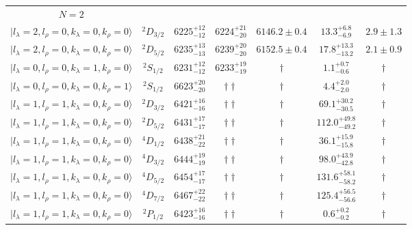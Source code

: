 \begin{tabular}{c c| c c c c c }
\hline
 $N=2$  &  &  &  &  &  \\ 
$\vert l_{\lambda}\!\!=\!2, l_{\rho}\!\!=\!0, k_{\lambda}\!\!=\!0, k_{\rho}\!\!=\!0 \rangle$ & $^{2}D_{3/2}$ & $6225^{+12}_{-12}$ & $6224^{+21}_{-20}$ & $6146.2\pm 0.4$ & $13.3^{+6.8}_{-6.9}$ & $2.9\pm 1.3$ \\ 
$\vert l_{\lambda}\!\!=\!2, l_{\rho}\!\!=\!0, k_{\lambda}\!\!=\!0, k_{\rho}\!\!=\!0 \rangle$ & $^{2}D_{5/2}$ & $6235^{+13}_{-13}$ & $6239^{+20}_{-20}$ & $6152.5\pm 0.4$ & $17.8^{+13.3}_{-13.2}$ & $2.1\pm 0.9$ \\ 
$\vert l_{\lambda}\!\!=\!0, l_{\rho}\!\!=\!0, k_{\lambda}\!\!=\!1, k_{\rho}\!\!=\!0 \rangle$ & $^{2}S_{1/2}$ & $6231^{+12}_{-12}$ & $6233^{+19}_{-19}$ & $\dagger$ & $1.1^{+0.7}_{-0.6}$ & $\dagger$ \\ 
$\vert l_{\lambda}\!\!=\!0, l_{\rho}\!\!=\!0, k_{\lambda}\!\!=\!0, k_{\rho}\!\!=\!1 \rangle$ & $^{2}S_{1/2}$ & $6623^{+20}_{-20}$ & $\dagger\dagger$ & $\dagger$ & $4.4^{+2.0}_{-2.0}$ & $\dagger$ \\ 
$\vert l_{\lambda}\!\!=\!1, l_{\rho}\!\!=\!1, k_{\lambda}\!\!=\!0, k_{\rho}\!\!=\!0 \rangle$ & $^{2}D_{3/2}$ & $6421^{+16}_{-16}$ & $\dagger\dagger$ & $\dagger$ & $69.1^{+30.2}_{-30.5}$ & $\dagger$ \\ 
$\vert l_{\lambda}\!\!=\!1, l_{\rho}\!\!=\!1, k_{\lambda}\!\!=\!0, k_{\rho}\!\!=\!0 \rangle$ & $^{2}D_{5/2}$ & $6431^{+17}_{-17}$ & $\dagger\dagger$ & $\dagger$ & $112.0^{+49.8}_{-49.2}$ & $\dagger$ \\ 
$\vert l_{\lambda}\!\!=\!1, l_{\rho}\!\!=\!1, k_{\lambda}\!\!=\!0, k_{\rho}\!\!=\!0 \rangle$ & $^{4}D_{1/2}$ & $6438^{+21}_{-22}$ & $\dagger\dagger$ & $\dagger$ & $36.1^{+15.9}_{-15.8}$ & $\dagger$ \\ 
$\vert l_{\lambda}\!\!=\!1, l_{\rho}\!\!=\!1, k_{\lambda}\!\!=\!0, k_{\rho}\!\!=\!0 \rangle$ & $^{4}D_{3/2}$ & $6444^{+19}_{-19}$ & $\dagger\dagger$ & $\dagger$ & $98.0^{+43.9}_{-42.8}$ & $\dagger$ \\ 
$\vert l_{\lambda}\!\!=\!1, l_{\rho}\!\!=\!1, k_{\lambda}\!\!=\!0, k_{\rho}\!\!=\!0 \rangle$ & $^{4}D_{5/2}$ & $6454^{+17}_{-17}$ & $\dagger\dagger$ & $\dagger$ & $131.6^{+58.1}_{-58.2}$ & $\dagger$ \\ 
$\vert l_{\lambda}\!\!=\!1, l_{\rho}\!\!=\!1, k_{\lambda}\!\!=\!0, k_{\rho}\!\!=\!0 \rangle$ & $^{4}D_{7/2}$ & $6467^{+22}_{-22}$ & $\dagger\dagger$ & $\dagger$ & $125.4^{+56.5}_{-56.6}$ & $\dagger$ \\ 
$\vert l_{\lambda}\!\!=\!1, l_{\rho}\!\!=\!1, k_{\lambda}\!\!=\!0, k_{\rho}\!\!=\!0 \rangle$ & $^{2}P_{1/2}$ & $6423^{+16}_{-16}$ & $\dagger\dagger$ & $\dagger$ & $0.6^{+0.2}_{-0.2}$ & $\dagger$ \\ 

\end{tabular}
